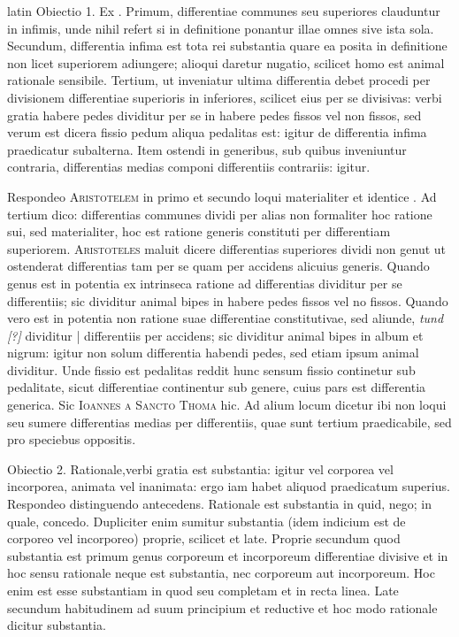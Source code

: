 \begin{otherlanguage*}{latin}
\pstart
Obiectio 1. Ex . Primum, differentiae communes seu superiores clauduntur in infimis, unde nihil refert si in definitione ponantur illae omnes sive ista sola. Secundum, differentia infima est tota rei substantia quare ea posita in definitione non licet superiorem adiungere; alioqui daretur nugatio, scilicet homo est animal rationale sensibile. Tertium, ut inveniatur ultima differentia debet procedi per divisionem differentiae superioris in inferiores, scilicet eius per se divisivas:
verbi gratia habere pedes dividitur per se in habere pedes fissos vel non fissos, sed verum est dicera fissio pedum aliqua pedalitas est:
igitur de differentia infima praedicatur subalterna. Item  ostendi in generibus, sub quibus inveniuntur contraria, differentias medias componi differentiis contrariis:
igitur. 
\pend

\pstart
Respondeo \textsc{Aristotelem} in primo et secundo loqui materialiter et identice . Ad tertium dico:
differentias communes dividi per alias non formaliter hoc ratione sui, sed materialiter, hoc est ratione generis constituti per differentiam superiorem. \textsc{Aristoteles} maluit dicere differentias superiores dividi non genut ut ostenderat differentias tam per se quam per accidens alicuius generis. Quando genus est in potentia ex intrinseca ratione ad differentias dividitur per se differentiis; sic dividitur animal bipes in habere pedes fissos vel no fissos. Quando vero est in potentia non ratione suae differentiae constitutivae, sed aliunde, \emph{tund [?]} dividitur \textnormal{|} differentiis per accidens; sic dividitur animal bipes in album et nigrum:
igitur non solum differentia habendi pedes, sed etiam ipsum animal dividitur. Unde fissio est pedalitas reddit hunc sensum fissio continetur sub pedalitate, sicut differentiae continentur sub genere, cuius pars est differentia generica. Sic \textsc{Ioannes a Sancto Thoma} hic. Ad alium locum dicetur ibi non loqui seu sumere differentias medias per differentiis, quae sunt tertium praedicabile, sed pro speciebus oppositis. 
\pend

\pstart
Obiectio 2. Rationale,verbi gratia est substantia:
igitur vel corporea vel incorporea, animata vel inanimata:
ergo iam habet aliquod praedicatum superius. Respondeo distinguendo antecedens. Rationale est substantia in quid, nego; in quale, concedo. Dupliciter enim sumitur substantia (idem indicium est de corporeo vel incorporeo) proprie, scilicet et late. Proprie secundum quod substantia est primum genus corporeum et incorporeum differentiae divisive et in hoc sensu rationale neque est substantia, nec corporeum aut incorporeum. Hoc enim est esse substantiam in quod seu completam et in recta linea. Late secundum habitudinem ad suum principium et reductive et hoc modo rationale dicitur substantia. 
\pend


\end{otherlanguage*}
